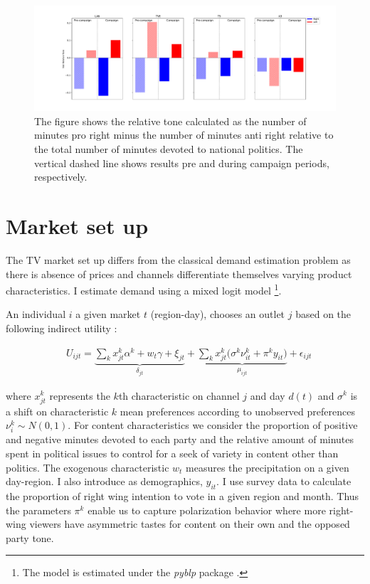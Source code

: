 \documentclass[12pt]{article}
\begin{document}
	\begin{figure}[h!]
		\centering
		\includegraphics[width=180mm]{figures/average_tone_pre_post_election}
		\caption{The figure shows the relative tone calculated as the number of minutes pro right minus the number of minutes anti right relative to the total number of minutes devoted to national politics. The vertical dashed line shows results pre and during campaign periods, respectively. }
		\label{fig:tone2}
	\end{figure}
	
	
	
	
	
	\section{Market set up}\label{section:market}
	
	The TV market set up differs from the classical demand estimation problem as there is absence of prices and channels differentiate themselves varying product characteristics. I estimate demand using a mixed logit model \citep{berry1994estimating} \footnote{The model is estimated under the \textit{pyblp} package \citep{conlon2020best}.}.
	
	
	
	An individual $ i $  a given market $ t $ (region-day), chooses an outlet $ j $ based on the following indirect utility : 
	
	
	\begin{equation}\label{eq:utility}
		\begin{aligned}
			& U_{ijt}= \underbrace{\sum_k x_{jt}^k\alpha^k+w_{t}\gamma  +  \xi_{jt}}_{\delta_{jt}}  + \underbrace{  \sum_k x_{jt}^k \Big( \sigma^k \nu_{it}^k  + \pi^ky_{it} \Big)}_{\mu_{ijt}}+\epsilon_{ijt} 
		\end{aligned}
	\end{equation} 
	
	where $ x_{jt}^k $ represents the $ k $th characteristic on channel $ j $ and day $ d(t) $ and $ \sigma^k $ is a shift on characteristic $ k $ mean preferences according to unobserved preferences $ \nu_{i}^k \sim N(0,1)$. For content characteristics we consider the proportion of positive and negative minutes devoted to each party and the relative amount  of minutes spent in political issues to control for a seek of variety in content other than politics.  The exogenous characteristic $w_t$ measures the precipitation on a given day-region. I also introduce as demographics, $ y_{it} $. I use survey data to calculate the proportion of right wing intention to vote in a given region and month. Thus the parameters $\pi^k$ enable us to capture polarization behavior where more right-wing viewers have asymmetric tastes for content on their own and the opposed party tone. 
	
\end{document}
